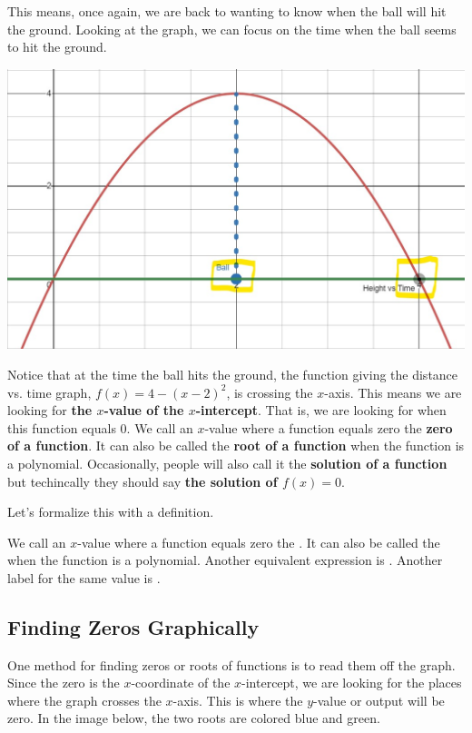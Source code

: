 \documentclass[nooutcomes]{ximera}
\begin{document}
\begin{example}
\begin{explanation}
This means, once again, we are back to wanting to know when the ball will hit the ground.  Looking at the graph, we can focus on the time when the ball seems to hit the ground.

\begin{image}
\includegraphics[width=.8\textwidth]{Zeros-BouncingBall7}
\end{image}

Notice that at the time the ball hits the ground, the function giving the distance vs. time graph, $f(x)=4-(x-2)^2$, is crossing the $x$-axis.  This means we are looking for \textbf{the $x$-value of the $x$-intercept}.  That is, we are looking for when this function equals 0.  We call an $x$-value where a function equals zero the \textbf{zero of a function}.  It can also be called the \textbf{root of a function} when the function is a polynomial.  Occasionally, people will also call it the \textbf{solution of a function} but techincally they should say \textbf{the solution of $f(x)=0$}.

Let's formalize this with a definition.

\begin{definition}
We call an $x$-value where a function equals zero the .  It can also be called the  when the function is a polynomial. Another equivalent expression is .  Another label for the same value is .
\end{definition}

\subsection{Finding Zeros Graphically}
One method for finding zeros or roots of functions is to read them off the graph. Since the zero is the $x$-coordinate of the $x$-intercept, we are looking for the places where the graph crosses the $x$-axis.  This is where the $y$-value or output will be zero.  In the image below, the two roots are colored blue and green.



\end{explanation}
\end{example}
\end{document}
